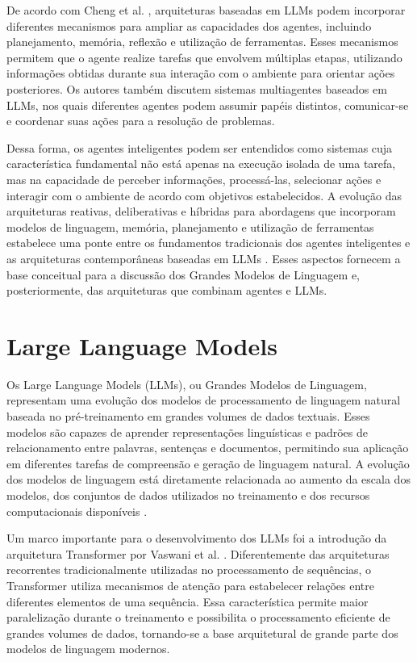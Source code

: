 De acordo com Cheng et al. \cite{cheng2026}, arquiteturas baseadas em LLMs
podem incorporar diferentes mecanismos para ampliar as capacidades dos
agentes, incluindo planejamento, memória, reflexão e utilização de
ferramentas. Esses mecanismos permitem que o agente realize tarefas que
envolvem múltiplas etapas, utilizando informações obtidas durante sua
interação com o ambiente para orientar ações posteriores. Os autores também
discutem sistemas multiagentes baseados em LLMs, nos quais diferentes agentes
podem assumir papéis distintos, comunicar-se e coordenar suas ações para a
resolução de problemas.

Dessa forma, os agentes inteligentes podem ser entendidos como sistemas cuja
característica fundamental não está apenas na execução isolada de uma tarefa,
mas na capacidade de perceber informações, processá-las, selecionar ações e
interagir com o ambiente de acordo com objetivos estabelecidos. A evolução
das arquiteturas reativas, deliberativas e híbridas para abordagens que
incorporam modelos de linguagem, memória, planejamento e utilização de
ferramentas estabelece uma ponte entre os fundamentos tradicionais dos
agentes inteligentes e as arquiteturas contemporâneas baseadas em LLMs
\cite{muller1999,cheng2026}. Esses aspectos fornecem a base conceitual para
a discussão dos Grandes Modelos de Linguagem e, posteriormente, das
arquiteturas que combinam agentes e LLMs.

\section{Large Language Models}
\label{sec:llm}

Os Large Language Models (LLMs), ou Grandes Modelos de Linguagem, representam uma evolução dos modelos de processamento de linguagem natural baseada no pré-treinamento em grandes volumes de dados textuais. Esses modelos são capazes de aprender representações linguísticas e padrões de relacionamento entre palavras, sentenças e documentos, permitindo sua aplicação em diferentes tarefas de compreensão e geração de linguagem natural. A evolução dos modelos de linguagem está diretamente relacionada ao aumento da escala dos modelos, dos conjuntos de dados utilizados no treinamento e dos recursos computacionais disponíveis \cite{zhao2023survey}.

Um marco importante para o desenvolvimento dos LLMs foi a introdução da arquitetura Transformer por Vaswani et al. \cite{vaswani2017attention}. Diferentemente das arquiteturas recorrentes tradicionalmente utilizadas no processamento de sequências, o Transformer utiliza mecanismos de atenção para estabelecer relações entre diferentes elementos de uma sequência. Essa característica permite maior paralelização durante o treinamento e possibilita o processamento eficiente de grandes volumes de dados, tornando-se a base arquitetural de grande parte dos modelos de linguagem modernos.

